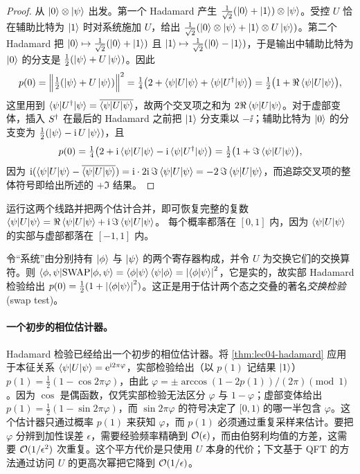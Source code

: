 \begin{proof}
从 $\ket{0}\otimes\ket{\psi}$ 出发。第一个 Hadamard 产生
$\tfrac{1}{\sqrt2}(\ket{0}+\ket{1})\otimes\ket{\psi}$。受控 $U$ 恰在辅助比特为 $\ket{1}$ 时对系统施加
$U$，给出
$\tfrac{1}{\sqrt2}(\ket{0}\otimes\ket{\psi}+\ket{1}\otimes U\ket{\psi})$。第二个 Hadamard 把 $\ket{0}\mapsto\tfrac{1}{\sqrt2}(\ket{0}+\ket{1})$ 且
$\ket{1}\mapsto\tfrac{1}{\sqrt2}(\ket{0}-\ket{1})$，于是输出中辅助比特为 $\ket{0}$ 的分支是 $\tfrac12(\ket{\psi}+U\ket{\psi})$。因此
\[
  p(0)=\Bigl\|\tfrac12(\ket{\psi}+U\ket{\psi})\Bigr\|^{2}
      =\tfrac14\bigl(2+\braket{\psi|U|\psi}+\braket{\psi|U^{\dagger}|\psi}\bigr)
      =\tfrac12\bigl(1+\Re\braket{\psi|U|\psi}\bigr),
\]
这里用到 $\braket{\psi|U^{\dagger}|\psi}=\overline{\braket{\psi|U|\psi}}$，故两个交叉项之和为 $2\Re\braket{\psi|U|\psi}$。对于虚部变体，插入 $S^{\dagger}$ 在最后的 Hadamard 之前把 $\ket{1}$ 分支乘以 $-\ii$；辅助比特为 $\ket{0}$ 的分支变为 $\tfrac12(\ket{\psi}-\mathrm{i}\,U\ket{\psi})$，且
\[
  p(0)=\tfrac14\bigl(2+\mathrm{i}\braket{\psi|U|\psi}-\mathrm{i}\braket{\psi|U^{\dagger}|\psi}\bigr)
      =\tfrac12\bigl(1+\Im\braket{\psi|U|\psi}\bigr),
\]
因为 $\mathrm{i}(\braket{\psi|U|\psi}-\overline{\braket{\psi|U|\psi}})
=\mathrm{i}\cdot 2\mathrm{i}\,\Im\braket{\psi|U|\psi}=-2\,\Im\braket{\psi|U|\psi}$，而追踪交叉项的整体符号即给出所述的 $+\Im$ 结果。
\end{proof}

运行这两个线路并把两个估计合并，即可恢复完整的复数
$\braket{\psi|U|\psi}=\Re\braket{\psi|U|\psi}+\mathrm{i}\,\Im\braket{\psi|U|\psi}$。
每个概率都落在 $[0,1]$ 内，因为 $\braket{\psi|U|\psi}$ 的实部与虚部都落在 $[-1,1]$ 内。

\begin{remark}[交换检验作为特例]
\label{rem:lec04-swap}
令``系统''由分别持有 $\ket{\phi}$ 与 $\ket{\psi}$ 的两个寄存器构成，并令 $U$ 为交换它们的交换算符。则
$\braket{\phi,\psi|\mathrm{SWAP}|\phi,\psi}=\braket{\phi|\psi}\braket{\psi|\phi}
=\left\lvert \braket{\phi|\psi} \right\rvert^{2}$，它是实的，故实部 Hadamard 检验给出
$p(0)=\tfrac12(1+\left\lvert \braket{\phi|\psi} \right\rvert^{2})$。这正是用于估计两个态之交叠的著名\emph{交换检验} (swap test)。
\end{remark}

\paragraph{一个初步的相位估计器。}
Hadamard 检验已经给出一个初步的相位估计器。将 \cref{thm:lec04-hadamard} 应用于本征关系
$\braket{\psi|U|\psi}=\mathrm{e}^{\mathrm{i} 2\pi\varphi}$，实部检验给出（以 $p(1)$ 记结果 $\ket{1}$）$p(1)=\tfrac12(1-\cos 2\pi\varphi)$，由此
$\varphi=\pm\arccos(1-2p(1))/(2\pi)\pmod 1$。因为 $\cos$ 是偶函数，仅凭实部检验无法区分 $\varphi$ 与 $1-\varphi$；虚部变体给出 $p(1)=\tfrac12(1-\sin 2\pi\varphi)$，而 $\sin 2\pi\varphi$ 的符号决定了 $[0,1)$ 的哪一半包含 $\varphi$。这个估计器只通过概率 $p(1)$ 来获知 $\varphi$，而 $p(1)$ 必须通过重复采样来估计。要把 $\varphi$ 分辨到加性误差 $\epsilon$，需要经验频率精确到 $\mathcal{O}(\epsilon)$，而由伯努利均值的方差，这需要 $\mathcal{O}(1/\epsilon^{2})$ 次重复。这个平方代价是只使用 $U$ 本身的代价；下文基于 QFT 的方法通过访问 $U$ 的更高次幂把它降到 $\mathcal{O}(1/\epsilon)$。

